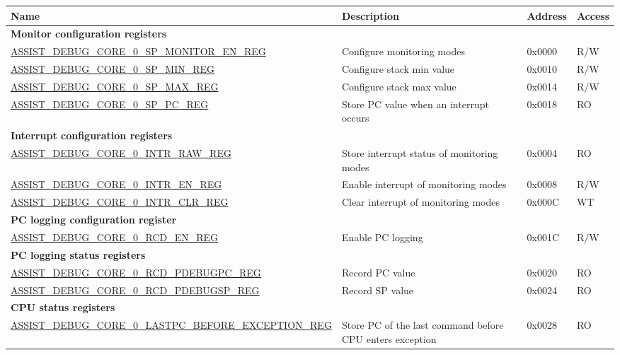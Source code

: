 \begin{longtable}{ | p{10cm} | p{4cm} | p{1.2cm} | p{1cm} | }
\hline\rowcolor{lightgray}
Name & Description &  Address & Access \\ \hline
\endhead
\multicolumn{4}{|l|}{\textbf{Monitor configuration registers}} \\ \hline
\hyperref[regdesc:ASSISTDEBUGCORE0SPMONITORENREG]{ASSIST\_DEBUG\_CORE\_0\_SP\_MONITOR\_EN\_REG} & Configure monitoring modes & 0x0000 & R/W \\ \hline
\hyperref[regdesc:ASSISTDEBUGCORE0SPMINREG]{ASSIST\_DEBUG\_CORE\_0\_SP\_MIN\_REG} & Configure stack min value & 0x0010 & R/W \\ \hline
\hyperref[regdesc:ASSISTDEBUGCORE0SPMAXREG]{ASSIST\_DEBUG\_CORE\_0\_SP\_MAX\_REG} & Configure stack max value & 0x0014 & R/W \\ \hline
\hyperref[regdesc:ASSISTDEBUGCORE0SPPCREG]{ASSIST\_DEBUG\_CORE\_0\_SP\_PC\_REG} & Store PC value when an interrupt occurs & 0x0018 & RO \\ \hline
\multicolumn{4}{|l|}{\textbf{Interrupt configuration registers}} \\ \hline
\hyperref[regdesc:ASSISTDEBUGCORE0INTRRAWREG]{ASSIST\_DEBUG\_CORE\_0\_INTR\_RAW\_REG} & Store interrupt status of monitoring modes  & 0x0004 & RO \\ \hline
\hyperref[regdesc:ASSISTDEBUGCORE0INTRENREG]{ASSIST\_DEBUG\_CORE\_0\_INTR\_EN\_REG} & Enable interrupt of monitoring modes & 0x0008 & R/W \\ \hline
\hyperref[regdesc:ASSISTDEBUGCORE0INTRCLRREG]{ASSIST\_DEBUG\_CORE\_0\_INTR\_CLR\_REG} & Clear interrupt of monitoring modes  & 0x000C & WT \\ \hline
\multicolumn{4}{|l|}{\textbf{PC logging configuration register}} \\ \hline
\hyperref[regdesc:ASSISTDEBUGCORE0RCDENREG]{ASSIST\_DEBUG\_CORE\_0\_RCD\_EN\_REG} & Enable PC logging & 0x001C & R/W \\ \hline
\multicolumn{4}{|l|}{\textbf{PC logging status registers}} \\ \hline
\hyperref[regdesc:ASSISTDEBUGCORE0RCDPDEBUGPCREG]{ASSIST\_DEBUG\_CORE\_0\_RCD\_PDEBUGPC\_REG} & Record PC value & 0x0020 & RO \\ \hline
\hyperref[regdesc:ASSISTDEBUGCORE0RCDPDEBUGSPREG]{ASSIST\_DEBUG\_CORE\_0\_RCD\_PDEBUGSP\_REG} & Record SP value & 0x0024 & RO \\ \hline
\multicolumn{4}{|l|}{\textbf{CPU status registers}} \\ \hline
\hyperref[regdesc:ASSISTDEBUGCORE0LASTPCBEFOREEXCEPTIONREG]{ASSIST\_DEBUG\_CORE\_0\_LASTPC\_BEFORE\_EXCEPTION\_REG} & Store PC of the last command before CPU enters exception & 0x0028 & RO \\ \hline

\end{longtable}
